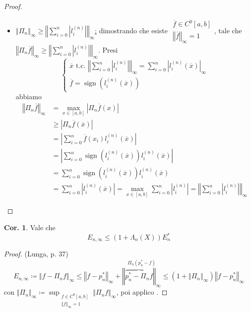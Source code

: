 \documentclass[a4paper,10pt]{article}
\theoremstyle{definition}
\DeclareMathOperator{\sign}{sign}
\theoremstyle{indentdefinition}
\theoremstyle{indenttheorem}
\newtheorem{cor}{Cor.}
\theoremstyle{myremark}
\theoremstyle{indentgeneral}
\theoremstyle{plain}
\theoremstyle{plain}
\newenvironment{myboxed} 
{\noindent\begin{lrbox}{\mybox}\begin{minipage}{\textwidth}}
{\end{minipage}\end{lrbox}\fbox{\usebox{\mybox}}}
\begin{document}
\begin{proof}
\begin{itemize}
        
        \item \underline{$\left\Vert \Pi_{n}\right\Vert _{\infty}\ge\left\Vert \sum_{i=0}^{n}\left|l_{i}^{\left(n\right)}\right|\right\Vert _{\infty}$:} dimostrando che esiste $\substack{\overline{f}\in C^{0}\left[a,b\right]\\
\left\Vert \overline{f}\right\Vert _{\infty}=1
}
$, tale che $\left\Vert \Pi_{n}\overline{f}\right\Vert _{\infty}\geq\left\Vert \sum_{i=0}^{n}\left|l_{i}^{\left(n\right)}\right|\right\Vert _{\infty}$.
Presi
$$\begin{cases}
    \overline{x} \text{ t.c. }\left\Vert \sum_{i=0}^{n}\left|l_{i}^{\left(n\right)}\right|\right\Vert _{\infty}=\sum_{i=0}^{n}\left|l_{i}^{\left(n\right)}\left(\overline{x}\right)\right|_{\infty}\\
\overline{f}=\sign\left(l_{i}^{\left(n\right)}\left(\overline{x}\right)\right)
\end{cases}$$
abbiamo
\begin{align*}
\left\Vert \Pi_{n}\overline{f}\right\Vert _{\infty} &=\max_{x\in\left[a,b\right]}\left|\Pi_{n}\overline{f}\left(x\right)\right|\\
&\geq\left|\Pi_{n}\overline{f}\left(\overline{x}\right)\right|\\
&=\left|\sum_{i=0}^{n}\overline{f}\left(x_{i}\right)l_{i}^{\left(n\right)}\left(\overline{x}\right)\right|\\
&=\left|\sum_{i=0}^{n}\sign\left(l_{i}^{\left(n\right)}\left(\overline{x}\right)\right)l_{i}^{\left(n\right)}\left(\overline{x}\right)\right|\\
&=\sum_{i=0}^{n}\sign\left(l_{i}^{\left(n\right)}\left(\overline{x}\right)\right)l_{i}^{\left(n\right)}\left(\overline{x}\right)\\
&=\sum_{i=0}^{n}\left|l_{i}^{\left(n\right)}\left(\overline{x}\right)\right|=\max_{x\in\left[a,b\right]}\sum_{i=0}^{n}\left|l_{i}^{\left(n\right)}\right|=\left\Vert \sum_{i=0}^{n}\left|l_{i}^{\left(n\right)}\right|\right\Vert _{\infty}
\end{align*}
    \end{itemize}
\end{proof}

\begin{myboxed}
\begin{cor}
Vale che $$E_{n,\infty}\leq\left(1+\Lambda_{n}\left(X\right)\right)E_n^*$$
\end{cor}
\end{myboxed}

\begin{proof}(Lunga, p. 37)
\[
E_{n,\infty}\coloneqq\left\Vert f-\Pi_{n}f\right\Vert _{\infty}\leq\left\Vert f-p_{n}^{*}\right\Vert _{\infty}+\overset{\Pi_{n}\left(p_{n}^{*}-f\right)}{\left\Vert \overbrace{p_{n}^{*}-\Pi_{n}f}\right\Vert _{\infty}}\leq\left(1+\left\Vert \Pi_{n}\right\Vert _{\infty}\right)\left\Vert f-p_{n}^{*}\right\Vert _{\infty}
\]
con $\left\Vert \Pi_{n}\right\Vert _{\infty}\coloneqq\sup_{\substack{f\in C^{0}\left[a,b\right]\\
\left\Vert f\right\Vert _{\infty}=1
}
}\left\Vert \Pi_{n}f\right\Vert _{\infty}$, poi applico .
\end{proof}
\end{document}
